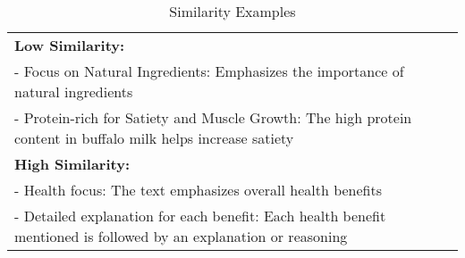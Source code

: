\begin{table}[htbp]
    \centering
    \small
    \begin{tabular}{p{7cm}}
     \toprule
\textbf{Low Similarity: } \\
\quad - Focus on Natural Ingredients: Emphasizes the importance of natural ingredients \\
\quad - Protein-rich for Satiety and Muscle Growth: The high protein content in buffalo milk helps increase satiety \\
\textbf{High Similarity: } \\
\quad - Health focus: The text emphasizes overall health benefits\\
\quad - Detailed explanation for each benefit: Each health benefit mentioned is followed by an explanation or reasoning \\
\bottomrule
    \end{tabular}
    \caption{Similarity Examples}
    \label{tab:similarity_examples}
\end{table}